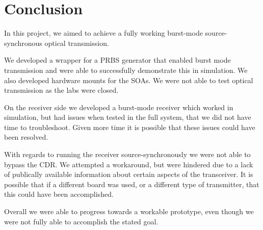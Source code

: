 \chapter{Conclusion}
In this project, we aimed to achieve a fully working burst-mode
source-synchronous optical transmission. 

We developed a wrapper for a PRBS generator that enabled burst mode
transmission and were able to successfully demonstrate this in simulation.
We also developed hardware mounts for the SOAs. We were not able to test optical
transmission as the labs were closed. 

On the receiver side we developed a burst-mode receiver which worked in simulation, but
had issues when tested in the full system, that we did not have time to troubleshoot. 
Given more time it is possible that these issues could have been resolved.  

With regards to running the receiver source-synchronously we were not able to
bypass the CDR.  We attempted a workaround, but were hindered due to
a lack of publically available information about certain aspects of the
transceiver. It is possible that if a different board was used, or a different
type of transmitter, that this could have been accomplished. 

Overall we were able to progress towards a workable prototype, even though we
were not fully able to accomplish the stated goal. 
